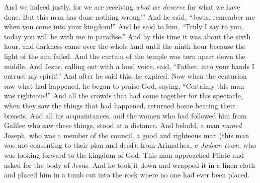 \begin{biblechapter}
\verse And we indeed justly, for we are receiving \textit{what we deserve} for what we have done. But this man has done nothing wrong!”
\verse And he said, “Jesus, remember me when you come into your kingdom!”
\verse And he said to him, “Truly I say to you, today you will be with me in paradise.”
 And by this time it was about the sixth hour, and darkness came over the whole land until the ninth hour
\verse because the light of the sun failed. And the curtain of the temple was torn apart down the middle.
\verse And Jesus, calling out with a loud voice, said, “Father, into your hands I entrust my spirit!” And after he said this, he expired.
\verse Now when the centurion saw what had happened, he began to praise God, saying, “Certainly this man was righteous!”
\verse And all the crowds that had come together for this spectacle, when they saw the things that had happened, returned home beating their breasts.
\verse And all his acquaintances, and the women who had followed him from Galilee who saw these things, stood at a distance.
 And behold, a man \textit{named} Joseph, who was a member of the council, a good and righteous man
\verse (this man was not consenting to their plan and deed), from Arimathea, \textit{a Judean town}, who was looking forward to the kingdom of God.
\verse This man approached Pilate and asked for the body of Jesus.
\verse And he took it down and wrapped it in a linen cloth and placed him in a tomb cut into the rock where no one had ever been placed.

\end{biblechapter}
